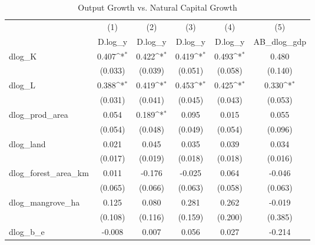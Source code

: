 \begin{table}[htbp]\centering
\def\sym#1{\ifmmode^{#1}\else\(^{#1}\)\fi}
\caption{Output Growth vs. Natural Capital Growth}
\begin{tabular}{l*{5}{c}}
\hline\hline
            &\multicolumn{1}{c}{(1)}&\multicolumn{1}{c}{(2)}&\multicolumn{1}{c}{(3)}&\multicolumn{1}{c}{(4)}&\multicolumn{1}{c}{(5)}\\
            &\multicolumn{1}{c}{D.log\_y}&\multicolumn{1}{c}{D.log\_y}&\multicolumn{1}{c}{D.log\_y}&\multicolumn{1}{c}{D.log\_y}&\multicolumn{1}{c}{AB\_dlog\_gdp}\\
\hline
dlog\_K      &       0.407\sym{*}&       0.422\sym{*}&       0.419\sym{*}&       0.493\sym{*}&       0.480       \\
            &     (0.033)       &     (0.039)       &     (0.051)       &     (0.058)       &     (0.140)       \\
[1em]
dlog\_L      &       0.388\sym{*}&       0.419\sym{*}&       0.453\sym{*}&       0.425\sym{*}&       0.330\sym{*}\\
            &     (0.031)       &     (0.041)       &     (0.045)       &     (0.043)       &     (0.053)       \\
[1em]
dlog\_prod\_area&       0.054       &       0.189\sym{*}&       0.095       &       0.015       &       0.055       \\
            &     (0.054)       &     (0.048)       &     (0.049)       &     (0.054)       &     (0.096)       \\
[1em]
dlog\_land   &       0.021       &       0.045       &       0.035       &       0.039       &       0.034       \\
            &     (0.017)       &     (0.019)       &     (0.018)       &     (0.018)       &     (0.016)       \\
[1em]
dlog\_forest\_area\_km&       0.011       &      -0.176       &      -0.025       &       0.064       &      -0.046       \\
            &     (0.065)       &     (0.066)       &     (0.063)       &     (0.058)       &     (0.063)       \\
[1em]
dlog\_mangrove\_ha&       0.125       &       0.080       &       0.281       &       0.262       &      -0.019       \\
            &     (0.108)       &     (0.116)       &     (0.159)       &     (0.200)       &     (0.385)       \\
[1em]
dlog\_b\_e    &      -0.008       &       0.007       &       0.056       &       0.027       &      -0.214       \\

\end{tabular}
\end{table}
